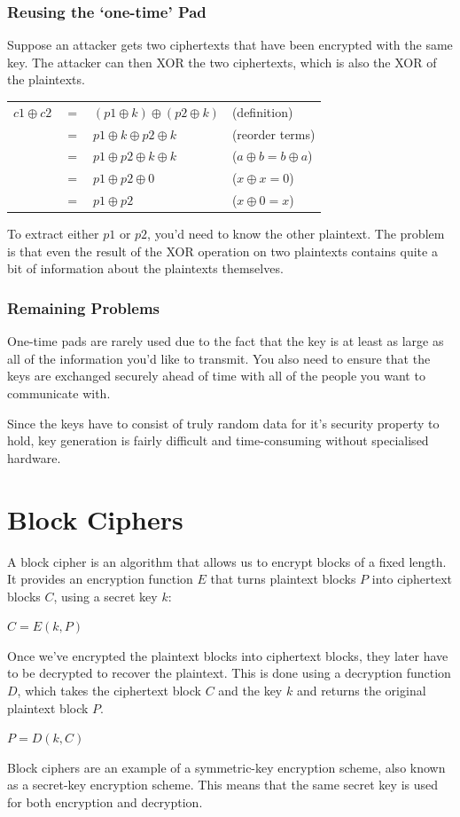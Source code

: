 \documentclass{article}
\begin{document}
\subsubsection{Reusing the `one-time' Pad}
Suppose an attacker gets two ciphertexts that have been encrypted with the same key. The attacker can then XOR the two ciphertexts, which is also the XOR of the plaintexts.
\begin{center}
	\begin{tabular}{lcll}
	$c1 \oplus c2$ & $=$ & $(p1 \oplus k) \oplus (p2 \oplus k)$ & (definition) \\
	& $=$ & $p1 \oplus k \oplus p2 \oplus k$ & (reorder terms) \\
	& $=$ & $p1 \oplus p2 \oplus k \oplus k$ & ($a \oplus b = b \oplus a$) \\
	& $=$ & $p1 \oplus p2 \oplus 0$ & ($x \oplus x = 0$) \\
	& $=$ & $p1 \oplus p2$ & ($x \oplus 0 = x$) \\
	\end{tabular}
\end{center}
To extract either $p1$ or $p2$, you'd need to know the other plaintext. The problem is that even the result of the XOR operation on two plaintexts contains quite a bit of information about the plaintexts themselves.

\subsubsection{Remaining Problems}
One-time pads are rarely used due to the fact that the key is at least as large as all of the information you'd like to transmit. You also need to ensure that the keys are exchanged securely ahead of time with all of the people you want to communicate with.

Since the keys have to consist of truly random data for it's security property to hold, key generation is fairly difficult and time-consuming without specialised hardware.

\section{Block Ciphers}
A block cipher is an algorithm that allows us to encrypt blocks of a fixed length. It provides an encryption function $E$ that turns plaintext blocks $P$ into ciphertext blocks $C$, using a secret key $k$:
\begin{center}
	$C = E(k, P)$
\end{center}
Once we've encrypted the plaintext blocks into ciphertext blocks, they later have to be decrypted to recover the plaintext. This is done using a decryption function $D$, which takes the ciphertext block $C$ and the key $k$ and returns the original plaintext block $P$.
\begin{center}
	$P = D(k, C)$
\end{center}
Block ciphers are an example of a symmetric-key encryption scheme, also known as a secret-key encryption scheme. This means that the same secret key is used for both encryption and decryption.
\end{document}
